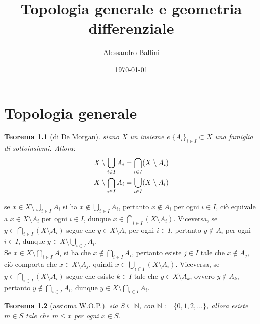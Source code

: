 \documentclass[oneside, 11pt]{amsbook}
\makeatletter
\newcommand{\0}{{(0)}}
\newcommand{\3}{{(3)}}
\theoremstyle{colonplain}
\newtheorem{thm}{Teorema}[chapter]
\theoremstyle{colondefinition}
\theoremstyle{colonremark}
\numberwithin{equation}{chapter}
\renewcommand{\proofname}{Dimostrazione}
\renewenvironment{proof}[1][\proofname]{\par
  \pushQED{\end{proof}}%
  \normalfont \topsep6\p@\@plus6\p@\relax
  \trivlist
  \item[\hskip\labelsep\bfseries #1:]\ignorespaces
}{%
  \popQED\endtrivlist\@endpefalse
}
\makeatother
\begin{document}
\date{\today}
\author{Alessandro Ballini}


\title{Topologia generale e geometria differenziale}

\maketitle
\tableofcontents

\chapter{Topologia generale}
\begin{thm}[di De Morgan]\label{DeMorg} 
    siano $X$ un insieme e $\{ A_i \}_{i \in I} \subset X$ una famiglia di sottoinsiemi. Allora:
    \begin{align}
        X \setminus \bigcup_{i \in I} A_i = \bigcap_{i \in I} (X \setminus A_i) \notag \\
        X \setminus \bigcap_{i \in I} A_i = \bigcup_{i \in I} (X \setminus A_i) \notag
    \end{align}
\end{thm}

\begin{proof}
    se $x \in X \setminus \bigcup_{i \in I} A_i$ si ha $x \not\in \bigcup_{i \in I} A_i$, pertanto $x \not\in A_i$ per ogni $i \in I$, ciò equivale a $x \in X \setminus A_i$ per ogni $i \in I$, dunque $x \in \bigcap_{i \in I} (X \setminus A_i)$. Viceversa, se $y \in \bigcap_{i \in I} (X \setminus A_i)$ segue che $y \in X \setminus A_i$ per ogni $i \in I$, pertanto $y \not\in A_i$ per ogni $i \in I$, dunque $y \in X \setminus \bigcup_{i \in I} A_i$. \\
    Se $x \in X \setminus \bigcap_{i \in I} A_i$ si ha che $x \not\in \bigcap_{i \in I} A_i$, pertanto esiste $j \in I$ tale che $x \not\in A_j$, ciò comporta che $x \in X \setminus A_j$, quindi $x \in \bigcup_{i \in I} (X \setminus A_i)$. Viceversa, se $y \in \bigcap_{i \in I} (X \setminus A_i)$ segue che esiste $k \in I$ tale che $y \in X \setminus A_k$, ovvero $y \not\in A_k$, pertanto $y \not\in \bigcap_{i \in I} A_i$, dunque $y \in X \setminus \bigcap_{i \in I} A_i$.
\end{proof}
\begin{thm}[assioma W.O.P.]\label{WOP}
    sia $S \subseteq \mathbb{N}$, con $\mathbb{N} := \{0, 1, 2, \dots\}$, allora esiste $m \in S$ tale che $m \leq x$ per ogni $x \in S$.
\end{thm}
\end{document}
